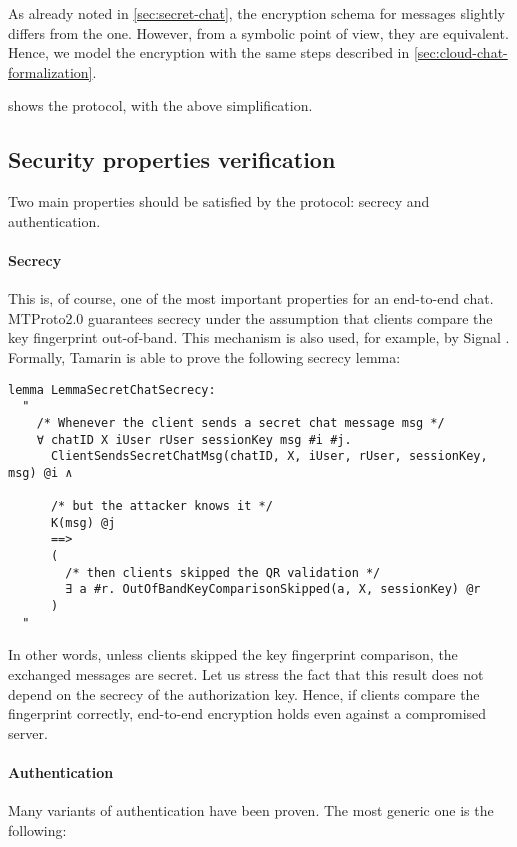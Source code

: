 As already noted in \cref{sec:secret-chat}, the encryption schema for \schat{} messages slightly differs from the \cchat{} one. However, from a symbolic point of view, they are equivalent. Hence, we model the \schat{} encryption with the same steps described in \cref{sec:cloud-chat-formalization}.

 shows the \schat{} protocol, with the above simplification.

\subsection{Security properties verification}

Two main properties should be satisfied by the \schat{} protocol: secrecy and authentication.


\paragraph{Secrecy} This is, of course, one of the most important properties for an end-to-end chat. MTProto2.0 guarantees secrecy under the assumption that clients compare the \schat{} key fingerprint out-of-band. This mechanism is also used, for example, by Signal \cite{SignalProtocol}. Formally, Tamarin is able to prove the following secrecy lemma:

\begin{lstlisting}
lemma LemmaSecretChatSecrecy:
  "
    /* Whenever the client sends a secret chat message msg */
    ∀ chatID X iUser rUser sessionKey msg #i #j.
      ClientSendsSecretChatMsg(chatID, X, iUser, rUser, sessionKey, msg) @i ∧
      
      /* but the attacker knows it */
      K(msg) @j
      ==>
      (
        /* then clients skipped the QR validation */
        ∃ a #r. OutOfBandKeyComparisonSkipped(a, X, sessionKey) @r
      )
  "
\end{lstlisting}

In other words, unless clients skipped the key fingerprint comparison, the exchanged messages are secret. Let us stress the fact that this result does not depend on the secrecy of the authorization key. Hence, if clients compare the fingerprint correctly, end-to-end encryption holds even against a compromised server.

\paragraph{Authentication}
Many variants of authentication have been proven. The most generic one is the following:

